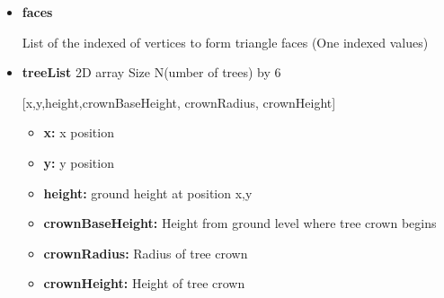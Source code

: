 \begin{itemize}
\begin{itemize}
                \item\textbf{faces} 
                \item[] List of the indexed of vertices to form triangle faces (One indexed values)
                \item\textbf{treeList} 2D array Size N(umber of trees) by 6
                \item[] [x,y,height,crownBaseHeight, crownRadius, crownHeight]
                    \begin{itemize}
                    \item\textbf{x:} x position
                    \item\textbf{y:} y position
                    \item\textbf{height:} ground height at position x,y
                    \item\textbf{crownBaseHeight:} Height from ground level where tree crown begins
                    \item\textbf{crownRadius:} Radius of tree crown
                    \item\textbf{crownHeight:} Height of tree crown 
                    \end{itemize}
                \end{itemize} 
\end{itemize}

